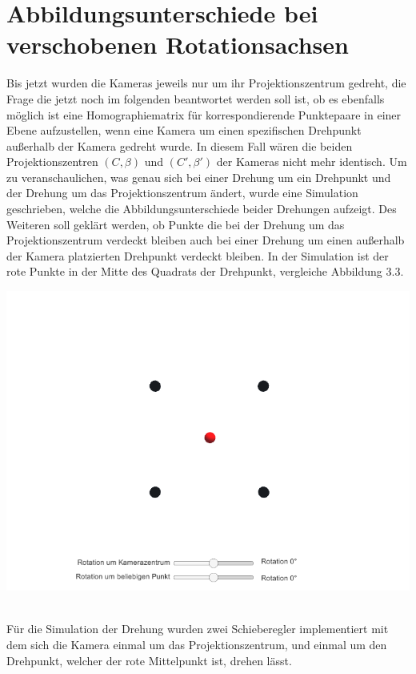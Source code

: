 \section{Abbildungsunterschiede bei verschobenen Rotationsachsen}


Bis jetzt wurden die Kameras jeweils nur um ihr Projektionszentrum gedreht, die Frage die jetzt noch im folgenden beantwortet werden soll ist, ob es ebenfalls möglich ist eine Homographiematrix für korrespondierende Punktepaare in einer Ebene aufzustellen, wenn eine Kamera um einen spezifischen Drehpunkt außerhalb der Kamera gedreht wurde. In diesem Fall wären die beiden Projektionszentren $(C,\beta)$ und $(C',\beta')$ der Kameras nicht mehr identisch. Um zu veranschaulichen, was genau sich bei einer Drehung um ein Drehpunkt und der Drehung um das Projektionszentrum ändert, wurde eine Simulation geschrieben, welche die Abbildungsunterschiede beider Drehungen aufzeigt. Des Weiteren soll geklärt werden, ob Punkte die bei der Drehung um das Projektionszentrum verdeckt bleiben auch bei einer Drehung um einen außerhalb der Kamera platzierten Drehpunkt verdeckt bleiben. In der Simulation ist der rote Punkte in der Mitte des Quadrats der Drehpunkt, vergleiche Abbildung 3.3. 

\begin{minipage}{\linewidth}
	\centering
	\includegraphics[width=.8\linewidth]{images/Ausgangslage.png}
\end{minipage}\\


Für die Simulation der Drehung wurden zwei Schieberegler implementiert mit dem sich die Kamera einmal um das Projektionszentrum, und einmal um den Drehpunkt, welcher der rote Mittelpunkt ist, drehen lässt.


